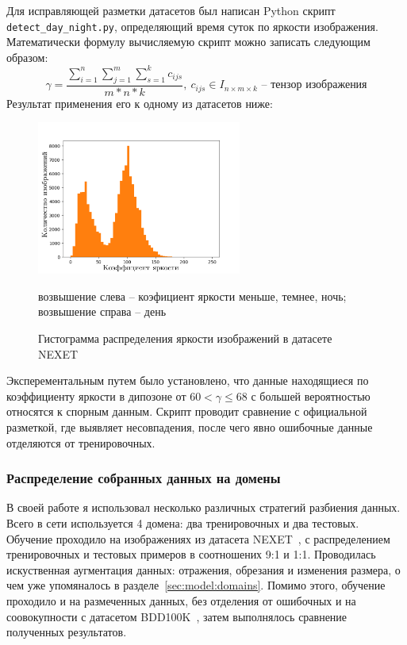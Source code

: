 \documentclass[11pt,a4paper]{extarticle}
\begin{document}
{			\noindent
			Для исправляющей разметки датасетов был написан Python скрипт \texttt{detect\_day\_night.py}, определяющий время суток по яркости изображения.
			Математически формулу вычисляемую скрипт можно записать следующим образом:
			\begin{equation}
				\gamma = \frac{\sum_{i=1}^{n}\sum_{j=1}^{m}\sum_{s=1}^{k}c_{ijs}}{m*n*k},\ c_{ijs} \in I_{n\times{m}\times{k}} \text{ -- тензор изображения}
			\end{equation} 
			Результат применения его к одному из датасетов ниже:
			\begin{figure}[ht]
				\centering
				\includegraphics[width=0.6\textwidth]{img/histogram60}
				\caption{Гистограмма распределения яркости изображений в датасете NEXET}{
					\small{
						возвышение слева -- коэфициент яркости меньше, темнее, ночь;
						возвышение справа -- день
					}
				}
				\label{pic:hist_detect}
			\end{figure}

			\noindent
			Эксперементальным путем было установлено, что данные находящиеся по коэффициенту яркости в дипозоне от \(60 < \gamma \le 68\) с большей вероятностью относятся к спорным данным.
			Скрипт проводит сравнение с официальной разметкой, где выявляет несовпадения, после чего явно ошибочные данные отделяются от тренировочных.
			
		\subsubsection*{Распределение собранных данных на домены}

			В своей работе я использовал несколько различных стратегий разбиения данных.
			Всего в сети используется 4 домена: два тренировочных и два тестовых.
			Обучение проходило на изображениях из датасета NEXET~\cite{data:nexet}, с распределением тренировочных и тестовых примеров в соотношених 9:1 и 1:1.
			Проводилась искуственная аугментация данных: отражения, обрезания и изменения размера, о чем уже упомяналось в разделе~\ref{sec:model:domains}.
			Помимо этого, обучение проходило и на размеченных данных, без отделения от ошибочных и на соовокупности с датасетом BDD100K~\cite{data:bdd100k}, затем выполнялось сравнение полученных результатов.
			
}
\end{document}
